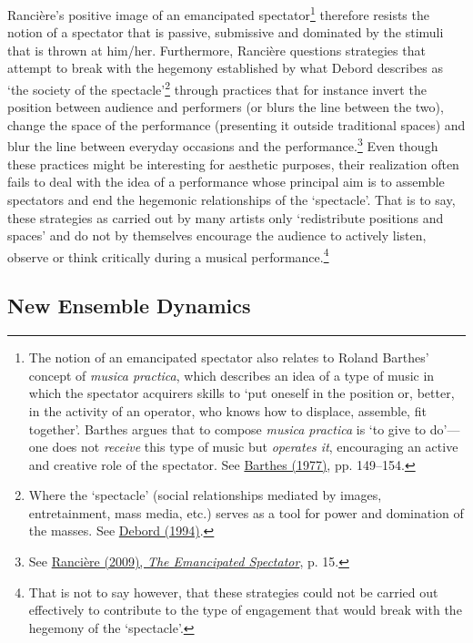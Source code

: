 Ranci\`{e}re's positive image of an emancipated spectator\footnote{The notion of an emancipated spectator also relates to Roland Barthes' concept of \emph{musica practica}, which describes an idea of a type of music in which the spectator acquirers skills to `put oneself in the position or, better, in the activity of an operator, who knows how to displace, assemble, fit together'. Barthes argues that to compose \emph{musica practica} is `to give to do'---one does not \emph{receive} this type of music but \emph{operates it}, encouraging an active and creative role of the spectator. See \hyperlink{barthes}{Barthes (1977)}, pp. 149--154.} therefore resists the notion of a spectator that is passive, submissive and dominated by the stimuli that is thrown at him/her. Furthermore, Ranci\`{e}re questions strategies that attempt to break with the hegemony established by what Debord describes as `the society of the spectacle'\footnote{Where the `spectacle' (social relationships mediated by images, entretainment, mass media, etc.) serves as a tool for power and domination of the masses. See \hyperlink{debord}{Debord (1994)}.} through practices that for instance invert the position between audience and performers (or blurs the line between the two), change the space of the performance (presenting it outside traditional spaces) and blur the line between everyday occasions and the performance.\footnote{See \hyperlink{ranspec}{Ranci\`{e}re (2009), \emph{The Emancipated Spectator}}, p. 15.} Even though these practices might be interesting for aesthetic purposes, their realization often fails to deal with the idea of a performance whose principal aim is to assemble spectators and end the hegemonic relationships of the `spectacle'. That is to say, these strategies as carried out by many artists only `redistribute positions and spaces' and do not by themselves encourage the audience to actively listen, observe or think critically during a musical performance.\footnote{That is not to say however, that these strategies could not be carried out effectively to contribute to the type of engagement that would break with the hegemony of the `spectacle'.} 

\subsection{New Ensemble Dynamics}
\hypertarget{ensembledy}{}

